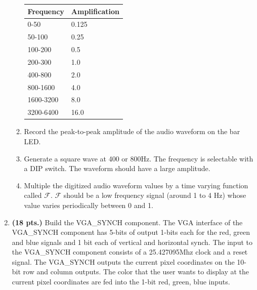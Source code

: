 \begin{enumerate}
\begin{enumerate}
\begin{tabular}{l|l}
Frequency	&	Amplification \\ \hline \hline
 0-50    	&	    0.125     \\ \hline
 50-100  	&	    0.25      \\ \hline
100-200  	&	    0.5       \\ \hline
200-300  	&	    1.0       \\ \hline
400-800  	&	    2.0       \\ \hline
800-1600 	&	    4.0       \\ \hline
1600-3200	&	    8.0       \\ \hline
3200-6400	&	   16.0       \\ 
\end{tabular}

\item Record the peak-to-peak amplitude of the audio waveform on the bar LED.
\item Generate a square wave at 400 or 800Hz.  The frequency is selectable
with a DIP switch.  The waveform should have a large amplitude.
\item Multiple the digitized audio waveform values by a time varying function
called $\mathcal{F}$.  $\mathcal{F}$ should be a low frequency signal 
(around 1 to 4 Hz) whose value varies periodically between 0 and 1.
\end{enumerate}


\item {\bf (18 pts.)}
Build the VGA\_SYNCH component.
The VGA interface of the VGA\_SYNCH component has 5-bits of output
1-bits each for the red, green and
blue signals and 1 bit each of vertical and horizontal synch. The
input to the VGA\_SYNCH component consists of a 25.427095Mhz clock and a reset 
signal. The VGA\_SYNCH outputs the current pixel coordinates on the 
10-bit row and column outputs. The color that the user wants to 
display at the current pixel coordinates are fed into the 1-bit 
red, green, blue inputs.



\end{enumerate}
